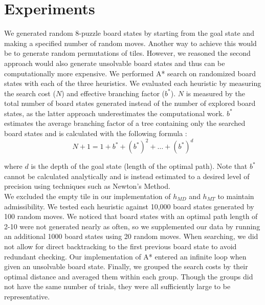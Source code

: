 
\section{Experiments}
\label{sec:expts}



We generated random 8-puzzle board states by starting from the goal state and making a specified number of random moves. Another way to achieve this would be to generate random permutations of tiles. However, we reasoned the second approach would also generate unsolvable board states and thus can be computationally more expensive. We performed A* search on randomized board states with each of the three heuristics. We evaluated each heuristic by measuring the search cost ($N$) and effective branching factor ($b^{*}$). $N$ is measured by the total number of board states generated instead of the number of explored board states, as the latter approach underestimates the computational work. $b^{*}$ estimates the average branching factor of a tree containing only the searched board states and is calculated with the following formula \cite{aima}:
$$N + 1 = 1 + b^{*} + (b^{*})^{2} + \dots + (b^{*})^{d}$$

\noindent where $d$ is the depth of the goal state (length of the optimal path). Note that $b^{*}$ cannot be calculated analytically and is instead estimated to a desired level of precision using techniques such as Newton's Method.\\

\noindent We excluded the empty tile in our implementation of $h_{MD}$ and $h_{MT}$ to maintain admissibility. We tested each heuristic against 10,000 board states generated by 100 random moves. We noticed that board states with an optimal path length of 2-10 were not generated nearly as often, so we supplemented our data by running an additional 1000 board states using 20 random moves. When searching, we did not allow for direct backtracking to the first previous board state to avoid redundant checking. Our implementation of A* entered an infinite loop when given an unsolvable board state. Finally, we grouped the search costs by their optimal distance and averaged them within each group. Though the groups did not have the same number of trials, they were all sufficiently large to be representative.